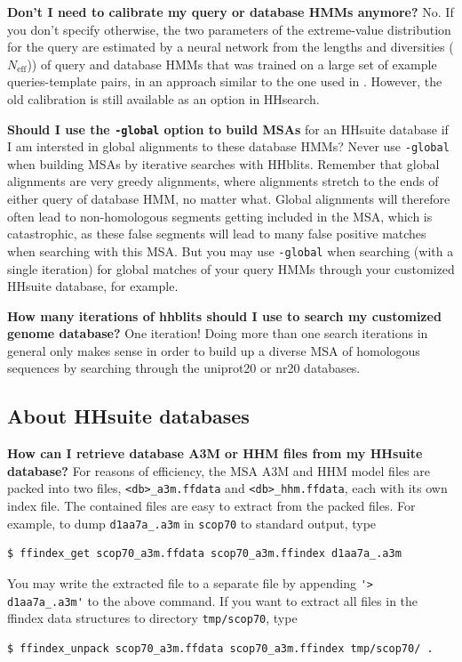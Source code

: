 \documentclass[11pt,a4paper]{article}
\begin{document}
{\bf Don't I need to calibrate my query or database HMMs anymore?}
No. If you don't specify otherwise, the two parameters of the extreme-value distribution for the query are estimated by a neural network from the lengths and diversities ($N_\mathrm{eff}$)) of query and database HMMs that was trained on a large set of example queries-template pairs, in an approach similar to the one used in \cite{Sadreyev:2008}. However, the old calibration is still available as an option in HHsearch.

{\bf Should I use the \verb`-global` option to build MSAs} for an HHsuite database if I am intersted in global alignments to these database HMMs?
Never use \verb`-global` when building MSAs by iterative searches with HHblits. Remember that global alignments are very greedy alignments, where alignments stretch to the ends of either query of database HMM, no matter what. Global alignments will therefore often lead to non-homologous segments getting included in the MSA, which is catastrophic, as these false segments will lead to many false positive matches when searching with this MSA. But you may use \verb`-global` when searching (with a single iteration) for global matches of your query HMMs through your customized HHsuite database, for example.

{\bf How many iterations of hhblits should I use to search my customized genome database?} One iteration! Doing more than one search iterations in general only makes sense in order to build up a diverse MSA of homologous sequences by searching through the uniprot20 or nr20 databases. 



\subsection{About HHsuite databases}


{\bf How can I retrieve database A3M or HHM files from my HHsuite database?}
For reasons of efficiency, the MSA A3M and HHM model files are packed into two files, \verb`<db>_a3m.ffdata` and \verb`<db>_hhm.ffdata`, each with its own index file. The contained files are easy to extract from the packed files. For example, to dump \verb`d1aa7a_.a3m` in \verb`scop70` to standard output, type 
\begin{verbatim}
$ ffindex_get scop70_a3m.ffdata scop70_a3m.ffindex d1aa7a_.a3m
\end{verbatim}
You may write the extracted file to a separate file by appending \verb`'> d1aa7a_.a3m'` to the above command.
If you want to extract all files in the ffindex data structures to directory \verb`tmp/scop70`, type
\begin{verbatim}
$ ffindex_unpack scop70_a3m.ffdata scop70_a3m.ffindex tmp/scop70/ .
\end{verbatim}
\end{document}
